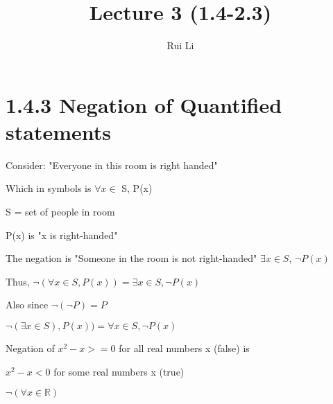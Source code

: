 \documentclass[11pt]{article}
\title{Lecture 3 (1.4-2.3)}
\author{Rui Li}
\begin{document}
\maketitle
\tableofcontents
\section*{1.4.3 Negation of Quantified statements}
Consider: "Everyone in this room is right handed"

Which in symbols is $\forall x \in$ S, P(x)
\bigskip

S = set of people in room

P(x) is "x is right-handed"

The negation is "Someone in the room is not right-handed"
$\exists x \in S$, $\neg P(x)$

Thus, $\neg(\forall x \in S, P(x)) = \exists x \in S, \neg P(x)$

Also since $\neg(\neg P) = P$

$\neg(\exists x \in S), P(x)) = \forall x \in S, \neg P(x)$
\bigskip

Negation of $x^2 - x >= 0$ for all real numbers x (false) is 

$x^2 -x < 0$ for some real numbers x (true)

$\neg(\forall x \in \mathbb{R})$
\end{document}
